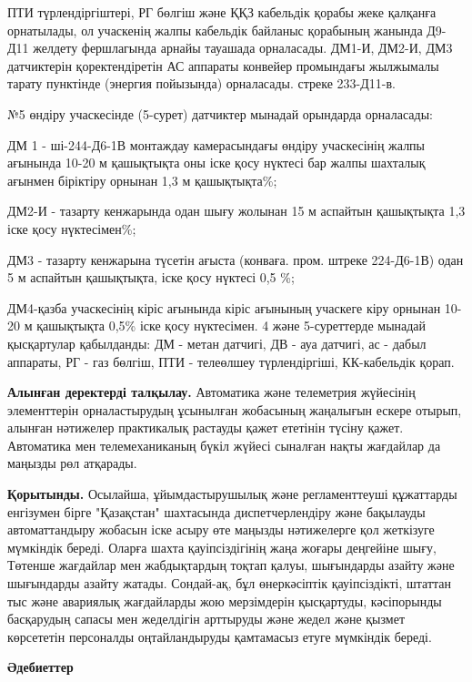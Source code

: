 \begin{multicols}{2}
ПТИ түрлендіргіштері, РГ бөлгіш және ҚҚЗ кабельдік қорабы жеке қалқанға
орнатылады, ол учаскенің жалпы кабельдік байланыс қорабының жанында
Д9-Д11 желдету фершлагында арнайы тауашада орналасады. ДМ1-И, ДМ2-И, ДМ3
датчиктерін қоректендіретін АС аппараты конвейер промындағы жылжымалы
тарату пунктінде (энергия пойызында) орналасады. стреке 233-Д11-в.

№5 өндіру учаскесінде (5-сурет) датчиктер мынадай орындарда орналасады:

ДМ 1 - ші-244-Д6-1В монтаждау камерасындағы өндіру учаскесінің жалпы
ағынында 10-20 м қашықтықта оны іске қосу нүктесі бар жалпы шахталық
ағынмен біріктіру орнынан 1,3 м қашықтықта\%;

ДМ2-И - тазарту кенжарында одан шығу жолынан 15 м аспайтын қашықтықта
1,3 іске қосу нүктесімен\%;

ДМ3 - тазарту кенжарына түсетін ағыста (конваға. пром. штреке 224-Д6-1В)
одан 5 м аспайтын қашықтықта, іске қосу нүктесі 0,5 \%;

ДМ4-қазба учаскесінің кіріс ағынында кіріс ағынының учаскеге кіру
орнынан 10-20 м қашықтықта 0,5\% іске қосу нүктесімен.
4 және 5-суреттерде мынадай қысқартулар қабылданды: ДМ - метан датчигі,
ДВ - ауа датчигі, ас - дабыл аппараты, РГ - газ бөлгіш, ПТИ -
телеөлшеу түрлендіргіші, КК-кабельдік қорап.

{\bfseries Алынған деректерді талқылау.} Автоматика және телеметрия
жүйесінің элементтерін орналастырудың ұсынылған жобасының жаңалығын
ескере отырып, алынған нәтижелер практикалық растауды қажет ететінін
түсіну қажет. Автоматика мен телемеханиканың бүкіл жүйесі сыналған нақты
жағдайлар да маңызды рөл атқарады.

{\bfseries Қорытынды.} Осылайша, ұйымдастырушылық және регламенттеуші
құжаттарды енгізумен бірге "Қазақстан" шахтасында диспетчерлендіру және
бақылауды автоматтандыру жобасын іске асыру өте маңызды нәтижелерге қол
жеткізуге мүмкіндік береді. Оларға шахта қауіпсіздігінің жаңа жоғары
деңгейіне шығу, Төтенше жағдайлар мен жабдықтардың тоқтап қалуы,
шығындарды азайту және шығындарды азайту жатады. Сондай-ақ, бұл
өнеркәсіптік қауіпсіздікті, штаттан тыс және авариялық жағдайларды жою
мерзімдерін қысқартуды, кәсіпорынды басқарудың сапасы мен жеделдігін
арттыруды және жедел және қызмет көрсететін персоналды оңтайландыруды
қамтамасыз етуге мүмкіндік береді.
\end{multicols}

\begin{center}
{\bfseries Әдебиеттер}
\end{center}

